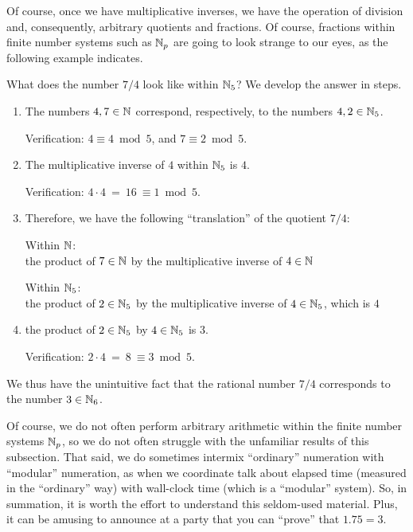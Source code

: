 \medskip

Of course, once we have multiplicative inverses, we have the operation
of division and, consequently, arbitrary quotients and fractions.  Of
course, fractions within finite number systems such as $\mathbb{N}_p$ are
going to look strange to our eyes, as the following example indicates.

What does the number $7/4$ look like within $\mathbb{N}_5$?  We develop the
answer in steps.
\bigskip

\noindent {}
\begin{enumerate}
\item
The numbers $4, 7 \in \mathbb{N}$ correspond, respectively, to the numbers $4,
2 \in \mathbb{N}_5$.

Verification:
$4 \equiv 4 \bmod 5$, and $7 \equiv 2 \bmod 5$.

\item
The multiplicative inverse of $4$ within $\mathbb{N}_5$ is $4$.

Verification:
$4 \cdot 4 \ = \ 16 \ \equiv 1 \bmod 5$.

\item
Therefore, we have the following ``translation'' of the quotient $7/4$:

Within $\mathbb{N}$: \\
the product of $7 \in \mathbb{N}$ by the multiplicative inverse of $4 \in \mathbb{N}$

Within $\mathbb{N}_5$: \\
the product of $2 \in \mathbb{N}_5$ by the multiplicative inverse of $4 \in
\mathbb{N}_5$, which is $4$

\item
the product of $2 \in \mathbb{N}_5$ by $4 \in \mathbb{N}_5$ is $3$.

Verification:
$2 \cdot 4 \ = \ 8 \ \equiv 3 \bmod 5$.
\end{enumerate}
We thus have the unintuitive fact that the rational number $7/4$
corresponds to the number $3 \in \mathbb{N}_6$.

Of course, we do not often perform arbitrary arithmetic within the
finite number systems $\mathbb{N}_p$, so we do not often struggle with the
unfamiliar results of this subsection.  That said, we do sometimes
intermix ``ordinary'' numeration with ``modular'' numeration, as when
we coordinate talk about elapsed time (measured in the ``ordinary''
way) with wall-clock time (which is a ``modular'' system).  So, in
summation, it is worth the effort to understand this seldom-used
material.  Plus, it can be amusing to announce at a party that you can
``prove'' that $1.75 = 3$.

